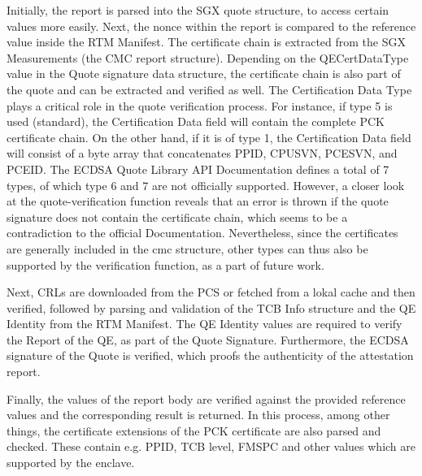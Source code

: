 Initially, the report is parsed into the SGX quote structure, to access certain values more easily. Next, the nonce within the report is compared to the reference value inside the RTM Manifest. The certificate chain is extracted from the SGX Measurements (the CMC report structure). Depending on the QECertDataType value in the Quote signature data structure, the certificate chain is also part of the quote and can be extracted and verified as well. 
The Certification Data Type plays a critical role in the quote verification process. For instance, if type 5 is used (standard), the Certification Data field will contain the complete PCK certificate chain. On the other hand, if it is of type 1, the Certification Data field will consist of a byte array that concatenates PPID, CPUSVN, PCESVN, and PCEID.
The ECDSA Quote Library API Documentation \cite{dcap_library_doc} defines a total of 7 types, of which type 6 and 7 are not officially supported. However, a closer look at the quote-verification function reveals that an error is thrown if the quote signature does not contain the certificate chain, which seems to be a contradiction to the official Documentation.   
Nevertheless, since the certificates are generally included in the cmc structure, other types can thus also be supported by the verification function, as a part of future work.

Next, CRLs are downloaded from the PCS or fetched from a lokal cache and then verified, followed by parsing and validation of the TCB Info structure and the QE Identity from the RTM Manifest. The QE Identity values are required to verify the Report of the QE, as part of the Quote Signature. 
Furthermore, the ECDSA signature of the Quote is verified, which proofs the authenticity of the attestation report.

Finally, the values of the report body are verified against the provided reference values and the corresponding result is returned.
In this process, among other things, the certificate extensions of the PCK certificate are also parsed and checked. These contain e.g. PPID, TCB level, FMSPC and other values which are supported by the enclave.
